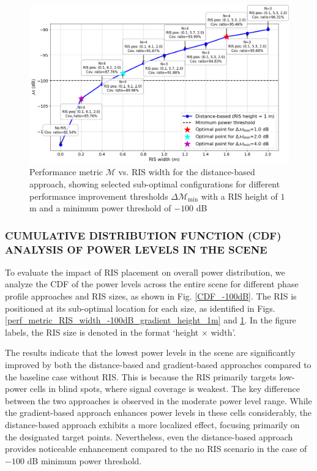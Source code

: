 \documentclass{IEEEoj}
\begin{document}
\begin{figure}
	\centering
	\includegraphics[width=\linewidth]{Sim_Results/perf_metric_RIS_width_-100dB_distance_height_1m.png}
	\caption{Performance metric $\mathcal{M}$ vs. RIS width for the distance-based approach, showing selected sub-optimal configurations for different performance improvement thresholds $\Delta \mathcal{M}_{\text{min}}$ with a RIS height of $1$ m and a minimum power threshold of $-100$ dB}
	\label{perf_metric_RIS_width_-100dB_distance_height_1m}
\end{figure}

\subsubsection{CUMULATIVE DISTRIBUTION FUNCTION (CDF) ANALYSIS OF POWER LEVELS IN THE SCENE}
To evaluate the impact of RIS placement on overall power distribution, we analyze the CDF of the power levels across the entire scene for different phase profile approaches and RIS sizes, as shown in Fig. \ref{CDF_-100dB}. The RIS is positioned at its sub-optimal location for each size, as identified in Figs. \ref{perf_metric_RIS_width_-100dB_gradient_height_1m} and \ref{perf_metric_RIS_width_-100dB_distance_height_1m}. In the figure labels, the RIS size is denoted in the format `height × width'.

The results indicate that the lowest power levels in the scene are significantly improved by both the distance-based and gradient-based approaches compared to the baseline case without RIS. This is because the RIS primarily targets low-power cells in blind spots, where signal coverage is weakest. The key difference between the two approaches is observed in the moderate power level range. While the gradient-based approach enhances power levels in these cells considerably, the distance-based approach exhibits a more localized effect, focusing primarily on the designated target points. Nevertheless, even the distance-based approach provides noticeable enhancement compared to the no RIS scenario in the case of $-100$ dB minimum power threshold.
\end{document}

